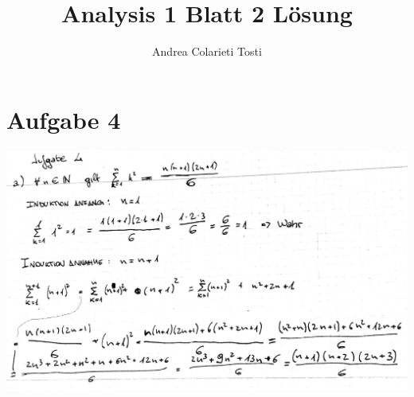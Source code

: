 \documentclass[12pt,a4paper,landscape]{article}
\author{Andrea Colarieti Tosti}
\title{Analysis 1 Blatt 2 Lösung}
\begin{document}
\maketitle \newpage

\section*{Aufgabe 4}
\includegraphics[scale=0.3]{AB2-4_1.jpg} 
\end{document}
